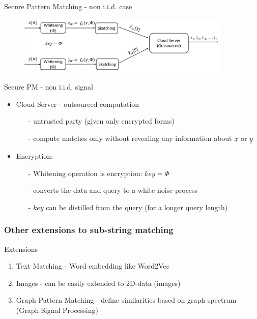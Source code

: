 \documentclass[10pt,xcolor=table]{beamer}
\newcommand{\xv}{\underline{x}}
\newcommand{\yv}{\underline{y}}
\begin{document}
\begin{frame}{Secure Pattern Matching - non i.i.d. case}
\begin{figure}
	\centering
	\includegraphics[width=4.0in]{securePM_noniid.png}
\end{figure}

\begin{block}{Secure PM - non i.i.d. signal}
	\begin{itemize}
		\item Cloud Server - outsourced computation
		\begin{itemize}
			\item[-] untrusted party (given only encrypted forms)
			\item[-] compute matches only without revealing any information about $\xv$ or $\yv$
		\end{itemize}
		\item Encryption:
		\begin{itemize}
			\item[-] Whitening operation is encryption: $key = \Phi$
			\item[-] converts the data and query to a white noise process 
			\item[-] $key$ can be distilled from the query (for a longer query length) 
		\end{itemize}
	\end{itemize}
\end{block}
\end{frame}

\begin{frame}
\frametitle{Other extensions to sub-string matching}

\begin{block}{Extensions}
	\begin{enumerate}
			\item Text Matching - Word embedding like Word2Vec
			\item Images - can be easily extended to 2D-data (images)
			\item Graph Pattern Matching  - define similarities based on graph spectrum (Graph Signal Processing)
	\end{enumerate}
\end{block}


\end{frame}
\end{document}
